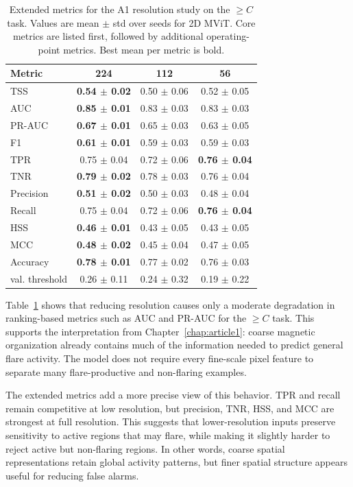 \begin{table}[!htbp]
\centering
\footnotesize
\setlength{\tabcolsep}{4pt}
\caption{Extended metrics for the A1 resolution study on the $\geq C$ task. Values are mean $\pm$ std over seeds for 2D MViT. Core metrics are listed first, followed by additional operating-point metrics. Best mean per metric is bold.}
\label{tab:appendix_res_c}
\begin{tabular}{lccc}
\toprule
Metric & 224 & 112 & 56 \\
\midrule
TSS & \textbf{0.54 $\pm$ 0.02} & 0.50 $\pm$ 0.06 & 0.52 $\pm$ 0.05 \\
AUC & \textbf{0.85 $\pm$ 0.01} & 0.83 $\pm$ 0.03 & 0.83 $\pm$ 0.03 \\
PR-AUC & \textbf{0.67 $\pm$ 0.01} & 0.65 $\pm$ 0.03 & 0.63 $\pm$ 0.05 \\
F1 & \textbf{0.61 $\pm$ 0.01} & 0.59 $\pm$ 0.03 & 0.59 $\pm$ 0.03 \\
TPR & 0.75 $\pm$ 0.04 & 0.72 $\pm$ 0.06 & \textbf{0.76 $\pm$ 0.04} \\
TNR & \textbf{0.79 $\pm$ 0.02} & 0.78 $\pm$ 0.03 & 0.76 $\pm$ 0.04 \\
Precision & \textbf{0.51 $\pm$ 0.02} & 0.50 $\pm$ 0.03 & 0.48 $\pm$ 0.04 \\
Recall & 0.75 $\pm$ 0.04 & 0.72 $\pm$ 0.06 & \textbf{0.76 $\pm$ 0.04} \\
HSS & \textbf{0.46 $\pm$ 0.01} & 0.43 $\pm$ 0.05 & 0.43 $\pm$ 0.05 \\
MCC & \textbf{0.48 $\pm$ 0.02} & 0.45 $\pm$ 0.04 & 0.47 $\pm$ 0.05 \\
Accuracy & \textbf{0.78 $\pm$ 0.01} & 0.77 $\pm$ 0.02 & 0.76 $\pm$ 0.03 \\
val. threshold & 0.26 $\pm$ 0.11 & 0.24 $\pm$ 0.32 & 0.19 $\pm$ 0.22 \\
\bottomrule
\end{tabular}
\end{table}

\FloatBarrier

Table~\ref{tab:appendix_res_c} shows that reducing resolution causes only a moderate degradation in ranking-based metrics such as AUC and PR-AUC for the $\geq C$ task. This supports the interpretation from Chapter~\ref{chap:article1}: coarse magnetic organization already contains much of the information needed to predict general flare activity. The model does not require every fine-scale pixel feature to separate many flare-productive and non-flaring examples.

The extended metrics add a more precise view of this behavior. TPR and recall remain competitive at low resolution, but precision, TNR, HSS, and MCC are strongest at full resolution. This suggests that lower-resolution inputs preserve sensitivity to active regions that may flare, while making it slightly harder to reject active but non-flaring regions. In other words, coarse spatial representations retain global activity patterns, but finer spatial structure appears useful for reducing false alarms.

